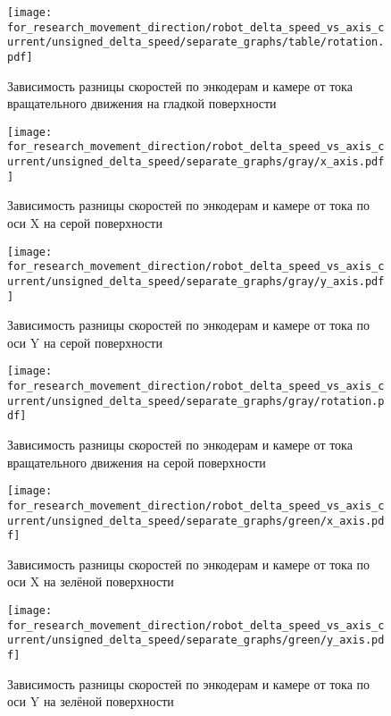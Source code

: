 \begin{figure}[H]
    \centering
    \texttt{[image: for\_research\_movement\_direction/robot\_delta\_speed\_vs\_axis\_current/unsigned\_delta\_speed/separate\_graphs/table/rotation.pdf]}
    \caption{Зависимость разницы скоростей по энкодерам и камере от тока вращательного движения на гладкой поверхности}
\end{figure}

\begin{figure}[H]
    \centering
    \texttt{[image: for\_research\_movement\_direction/robot\_delta\_speed\_vs\_axis\_current/unsigned\_delta\_speed/separate\_graphs/gray/x\_axis.pdf]}
    \caption{Зависимость разницы скоростей по энкодерам и камере от тока по оси X на серой поверхности}
\end{figure}

\begin{figure}[H]
    \centering
    \texttt{[image: for\_research\_movement\_direction/robot\_delta\_speed\_vs\_axis\_current/unsigned\_delta\_speed/separate\_graphs/gray/y\_axis.pdf]}
    \caption{Зависимость разницы скоростей по энкодерам и камере от тока по оси Y на серой поверхности}
\end{figure}

\begin{figure}[H]
    \centering
    \texttt{[image: for\_research\_movement\_direction/robot\_delta\_speed\_vs\_axis\_current/unsigned\_delta\_speed/separate\_graphs/gray/rotation.pdf]}
    \caption{Зависимость разницы скоростей по энкодерам и камере от тока вращательного движения на серой поверхности}
\end{figure}

\begin{figure}[H]
    \centering
    \texttt{[image: for\_research\_movement\_direction/robot\_delta\_speed\_vs\_axis\_current/unsigned\_delta\_speed/separate\_graphs/green/x\_axis.pdf]}
    \caption{Зависимость разницы скоростей по энкодерам и камере от тока по оси X на зелёной поверхности}
\end{figure}

\begin{figure}[H]
    \centering
    \texttt{[image: for\_research\_movement\_direction/robot\_delta\_speed\_vs\_axis\_current/unsigned\_delta\_speed/separate\_graphs/green/y\_axis.pdf]}
    \caption{Зависимость разницы скоростей по энкодерам и камере от тока по оси Y на зелёной поверхности}
\end{figure}

